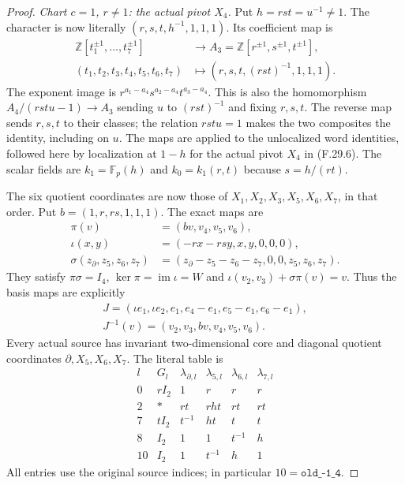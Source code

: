 \begin{proof}
\emph{Chart $c=1$, $r\ne1$: the actual pivot $X_4$.}
Put $h=rst=u^{-1}\ne1$.
The character is now literally
$(r,s,t,h^{-1},1,1,1)$.
Its coefficient map is
\[
 \begin{aligned}
 \mathbb Z[t_1^{\pm1},\ldots,t_7^{\pm1}]&\longrightarrow
       A_3=\mathbb Z[r^{\pm1},s^{\pm1},t^{\pm1}],\\
 (t_1,t_2,t_3,t_4,t_5,t_6,t_7)&\longmapsto
                         (r,s,t,(rst)^{-1},1,1,1).
 \end{aligned}                                                \tag{F.29.19}
\]
The exponent image is
$r^{a_1-a_4}s^{a_2-a_4}t^{a_3-a_4}$.
This is also the homomorphism
$A_4/(rstu-1)\to A_3$ sending $u$ to
$(rst)^{-1}$ and fixing $r,s,t$.
The reverse map sends $r,s,t$ to their classes;
the relation $rstu=1$ makes the two composites
the identity, including on $u$.
The maps are applied to the unlocalized word
identities, followed here by localization at
$1-h$ for the actual pivot $X_4$ in (F.29.6).
The scalar fields are $k_1=\mathbb F_p(h)$
and $k_0=k_1(r,t)$ because $s=h/(rt)$.

The six quotient coordinates are now those
of $X_1,X_2,X_3,X_5,X_6,X_7$, in that order.
Put $b=(1,r,rs,1,1,1)$. The exact maps are
\[
 \begin{aligned}
 \pi(v)&=(bv,v_4,v_5,v_6),\\
 \iota(x,y)&=(-rx-rsy,x,y,0,0,0),\\
 \sigma(z_\partial,z_5,z_6,z_7)
              &=(z_\partial-z_5-z_6-z_7,0,0,z_5,z_6,z_7).
 \end{aligned}                                                \tag{F.29.20}
\]
They satisfy $\pi\sigma=I_4$,
$\ker\pi=\operatorname{im}\iota=W$ and
$\iota(v_2,v_3)+\sigma\pi(v)=v$.
Thus the basis maps are explicitly
\[
 \begin{gathered}
 J=(\iota e_1,\iota e_2,e_1,e_4-e_1,e_5-e_1,e_6-e_1),\\
                    J^{-1}(v)=(v_2,v_3,bv,v_4,v_5,v_6).
 \end{gathered}                                                \tag{F.29.21}
\]
Every actual source has invariant two-dimensional
core and diagonal quotient coordinates
$\partial,X_5,X_6,X_7$. The literal table is
\[
 \begin{array}{c|c|cccc}
 l&G_l&\lambda_{\partial,l}&\lambda_{5,l}
                         &\lambda_{6,l}&\lambda_{7,l}\\\hline
 0&rI_2&1&r&r&r\\
 2&*&rt&rht&rt&rt\\
 7&tI_2&t^{-1}&ht&t&t\\
 8&I_2&1&1&t^{-1}&h\\
 10&I_2&1&t^{-1}&h&1
 \end{array}
                                                               \tag{F.29.22}
\]
All entries use the original source indices;
in particular $10=\texttt{old\_-1\_4}$.


\end{proof}
